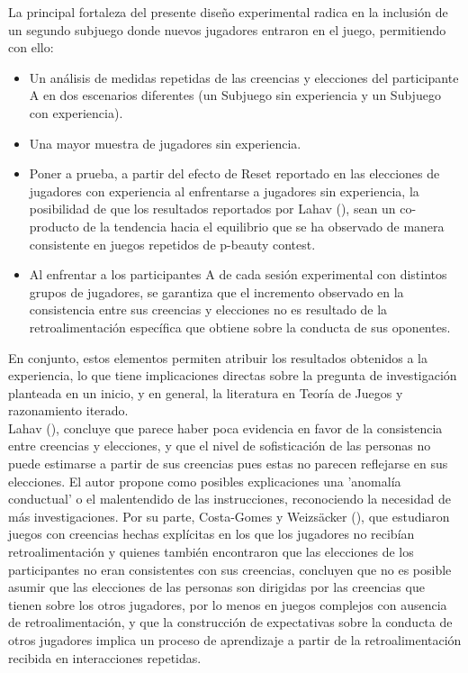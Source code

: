 La principal fortaleza del presente diseño experimental radica en la inclusión de un segundo subjuego donde nuevos jugadores entraron en el juego, permitiendo con ello:

\begin{itemize}
\item Un análisis de medidas repetidas de las creencias y elecciones del participante A en dos escenarios diferentes (un Subjuego sin experiencia y un Subjuego con experiencia).

\item Una mayor muestra de jugadores sin experiencia.

\item Poner a prueba, a partir del efecto de Reset reportado en las elecciones de jugadores con experiencia al enfrentarse a jugadores sin experiencia, la posibilidad de que los resultados reportados por Lahav (\citeyear{Lahav}), sean un co-producto de la tendencia hacia el equilibrio que se ha observado de manera consistente en juegos repetidos de p-beauty contest.

\item Al enfrentar a los participantes A de cada sesión experimental con distintos grupos de jugadores, se garantiza que el incremento observado en la consistencia entre sus creencias y elecciones no es resultado de la retroalimentación específica que obtiene sobre la conducta de sus oponentes.
\end{itemize}

En conjunto, estos elementos permiten atribuir los resultados obtenidos a la experiencia, lo que tiene implicaciones directas sobre la pregunta de investigación planteada en un inicio, y en general, la literatura en Teoría de Juegos y razonamiento iterado.\\

Lahav (\citeyear{Lahav}), concluye que parece haber poca evidencia en favor de la consistencia entre creencias y elecciones, y que el nivel de sofisticación de las personas no puede estimarse a partir de sus creencias pues estas no parecen reflejarse en sus elecciones. El autor propone como posibles explicaciones una 'anomalía conductual' o el malentendido de las instrucciones, reconociendo la necesidad de más investigaciones. Por su parte, Costa-Gomes y Weizsäcker (\citeyear{Costa-Gomes}), que estudiaron juegos con creencias hechas explícitas en los que los jugadores no recibían retroalimentación y quienes también encontraron que las elecciones de los participantes no eran consistentes con sus creencias, concluyen que no es posible asumir que las elecciones de las personas son dirigidas por las creencias que tienen sobre los otros jugadores, por lo menos en juegos complejos con ausencia de retroalimentación, y que la construcción de expectativas sobre la conducta de otros jugadores implica un proceso de aprendizaje a partir de la retroalimentación recibida en interacciones repetidas.\\

